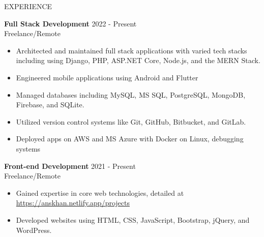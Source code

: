 \documentclass{resume} %
\begin{document}
\begin{rSection}{EXPERIENCE}

\textbf{Full Stack Development} \hfill 2022 - Present\\
Freelance/Remote %
 \begin{itemize}
    \itemsep -3pt {} 
     \item Architected and maintained full stack applications with varied tech stacks including using Django, PHP, ASP.NET Core, Node.js, and the MERN Stack.
     \item Engineered mobile applications using Android and Flutter
     \item Managed databases including MySQL, MS SQL, PostgreSQL, MongoDB, Firebase, and SQLite. \item Utilized version control systems like Git, GitHub, Bitbucket, and GitLab.
     \item Deployed apps on AWS and MS Azure with Docker on Linux, debugging systems 
 \end{itemize}


\textbf{Front-end Development} \hfill 2021  - Present\\
Freelance/Remote  \hfill %
 \begin{itemize}
    \itemsep -3pt {} 
     \item Gained expertise in core web technologies, detailed at  \href{https://anskhan.netlify.app/projects}{https://anskhan.netlify.app/projects}
     \item Developed websites using HTML, CSS, JavaScript, Bootstrap, jQuery, and WordPress.
   
 \end{itemize}
 

\end{rSection} 

\end{document}
